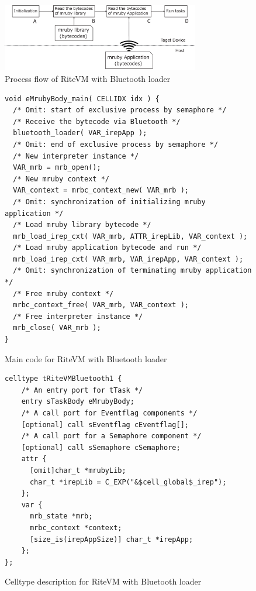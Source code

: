 \documentclass[conference]{IEEEtran/IEEEtran/IEEEtran}
\begin{document}
\begin{figure}[t]
    \centering
    \includegraphics[height=3.0cm,width=8.6cm,clip]{figure/control_flow.eps}
    \vspace{-3mm}
\caption{Process flow of RiteVM with Bluetooth loader}
    \vspace{-3mm}
\label{fig:control_flow}
\end{figure}

\begin{figure}[t]
\centering
\begin{lstlisting}
void eMrubyBody_main( CELLIDX idx ) {
  /* Omit: start of exclusive process by semaphore */
  /* Receive the bytecode via Bluetooth */
  bluetooth_loader( VAR_irepApp );
  /* Omit: end of exclusive process by semaphore */
  /* New interpreter instance */
  VAR_mrb = mrb_open();
  /* New mruby context */
  VAR_context = mrbc_context_new( VAR_mrb );
  /* Omit: synchronization of initializing mruby application */
  /* Load mruby library bytecode */
  mrb_load_irep_cxt( VAR_mrb, ATTR_irepLib, VAR_context );
  /* Load mruby application bytecode and run */
  mrb_load_irep_cxt( VAR_mrb, VAR_irepApp, VAR_context );
  /* Omit: synchronization of terminating mruby application */
  /* Free mruby context */
  mrbc_context_free( VAR_mrb, VAR_context );
  /* Free interpreter instance */
  mrb_close( VAR_mrb );
}

\end{lstlisting}
    \vspace{-3mm}
\caption{Main code for RiteVM with Bluetooth loader}
    \vspace{-3mm}
\label{maincode_mrubybluetooth}
\end{figure}


\begin{figure}[t]
\centering
\begin{lstlisting}
celltype tRiteVMBluetooth1 {
    /* An entry port for tTask */
    entry sTaskBody eMrubyBody;
    /* A call port for Eventflag components */
    [optional] call sEventflag cEventflag[];
    /* A call port for a Semaphore component */
    [optional] call sSemaphore cSemaphore;
    attr {
      [omit]char_t *mrubyLib;
      char_t *irepLib = C_EXP("&$cell_global$_irep");
    };
    var {
      mrb_state *mrb;
      mrbc_context *context;
      [size_is(irepAppSize)] char_t *irepApp;
    };
};
\end{lstlisting}
    \vspace{-3mm}
\caption{Celltype description for RiteVM with Bluetooth loader}
    \vspace{-3mm}
\label{celltype_mrubybluetooth}
\end{figure}
\end{document}
